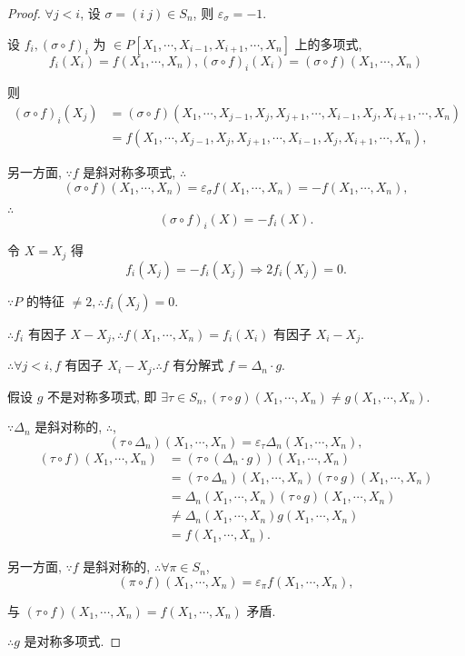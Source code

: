 \documentclass[color=black,device=normal,lang=cn,mode=geye]{elegantnote}
\begin{document}
\begin{proof}
    $\forall j<i$, 设 $\sigma=(i\ j)\in S_n$, 则 $\varepsilon_\sigma=-1$.

    设 $f_i,(\sigma\circ f)_i$ 为 $\in P[X_1,\cdots,X_{i-1},X_{i+1},\cdots,X_n]$ 上的多项式,
    \[f_i(X_i)=f(X_1,\cdots,X_n),(\sigma\circ f)_i(X_i)=(\sigma\circ f)(X_1,\cdots,X_n)\]
    
    则
    \begin{align*}
        (\sigma\circ f)_i(X_j) & =(\sigma\circ f)(X_1,\cdots,X_{j-1},X_j,X_{j+1},\cdots,X_{i-1},X_j,X_{i+1},\cdots,X_n) \\
        & =f(X_1,\cdots,X_{j-1},X_j,X_{j+1},\cdots,X_{i-1},X_j,X_{i+1},\cdots,X_n),
    \end{align*}

    另一方面, $\because f$ 是斜对称多项式, $\therefore$
    \[(\sigma\circ f)(X_1,\cdots,X_n)=\varepsilon_\sigma f(X_1,\cdots,X_n)=-f(X_1,\cdots,X_n),\]

    $\therefore$
    \[(\sigma\circ f)_i(X)=-f_i(X).\]

    令 $X=X_j$ 得
    \[f_i(X_j)=-f_i(X_j)\Rightarrow2f_i(X_j)=0.\]

    $\because P$ 的特征 $\neq2,\therefore f_i(X_j)=0$.

    $\therefore f_i$ 有因子 $X-X_j,\therefore f(X_1,\cdots,X_n)=f_i(X_i)$ 有因子 $X_i-X_j$.

    $\therefore\forall j<i,f$ 有因子 $X_i-X_j.\therefore f$ 有分解式 $f=\Delta_n\cdot g$.

    假设 $g$ 不是对称多项式, 即 $\exists\tau\in S_n,(\tau\circ g)(X_1,\cdots,X_n)\neq g(X_1,\cdots,X_n)$.

    $\because\Delta_n$ 是斜对称的, $\therefore$,
    \[(\tau\circ\Delta_n)(X_1,\cdots,X_n)=\varepsilon_\tau\Delta_n(X_1,\cdots,X_n),\]
    \begin{align*}
        (\tau\circ f)(X_1,\cdots,X_n) & =(\tau\circ(\Delta_n\cdot g))(X_1,\cdots,X_n) \\
        & =(\tau\circ\Delta_n)(X_1,\cdots,X_n)(\tau\circ g)(X_1,\cdots,X_n) \\
        & =\Delta_n(X_1,\cdots,X_n)(\tau\circ g)(X_1,\cdots,X_n) \\
        & \neq\Delta_n(X_1,\cdots,X_n)g(X_1,\cdots,X_n) \\
        & =f(X_1,\cdots,X_n).
    \end{align*}
    
    另一方面, $\because f$ 是斜对称的, $\therefore\forall\pi\in S_n$,
    \[(\pi\circ f)(X_1,\cdots,X_n)=\varepsilon_\pi f(X_1,\cdots,X_n),\]

    与 $(\tau\circ f)(X_1,\cdots,X_n)=f(X_1,\cdots,X_n)$ 矛盾.

    $\therefore g$ 是对称多项式.
\end{proof}
\end{document}
